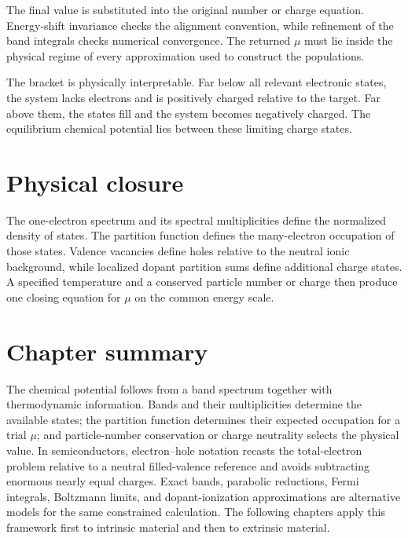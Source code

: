The final value is substituted into the original number or charge equation.
Energy-shift invariance checks the alignment convention, while refinement of
the band integrals checks numerical convergence.  The returned $\mu$ must lie
inside the physical regime of every approximation used to construct the
populations.

The bracket is physically interpretable.  Far below all relevant electronic
states, the system lacks electrons and is positively charged relative to the
target.  Far above them, the states fill and the system becomes negatively
charged.  The equilibrium chemical potential lies between these limiting charge
states.

\section{Physical closure}

The one-electron spectrum and its spectral multiplicities define the normalized
density of states.  The partition function defines the many-electron occupation
of those states.  Valence vacancies define holes relative to the neutral ionic
background, while localized dopant partition sums define additional charge
states.  A specified temperature and a conserved particle number or charge then
produce one closing equation for $\mu$ on the common energy scale.

\section{Chapter summary}

The chemical potential follows from a band spectrum together with thermodynamic
information.  Bands and their multiplicities determine the available states;
the partition function determines their expected occupation
for a trial $\mu$; and particle-number conservation or charge neutrality
selects the physical value.  In semiconductors, electron--hole notation recasts
the total-electron problem relative to a neutral filled-valence reference and
avoids subtracting enormous nearly equal charges.  Exact bands, parabolic
reductions, Fermi integrals, Boltzmann limits, and dopant-ionization
approximations are alternative models for the same constrained calculation.
The following chapters apply this framework first to intrinsic material and
then to extrinsic material.
